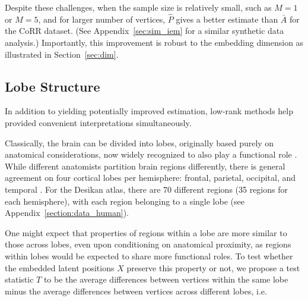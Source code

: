 \documentclass[journal,twoside,web]{ieeecolor}
\begin{document}
Despite these challenges, when the sample size is relatively small, such as $M=1$ or $M=5$, and for larger number of vertices, $\hat{P}$ gives a better estimate than $\bar{A}$ for the CoRR dataset.
(See Appendix~\ref{sec:sim_iem} for a similar synthetic data analysis.)
Importantly, this improvement is robust to the embedding dimension as illustrated in Section~\ref{sec:dim}.



\subsection{Lobe Structure}
\label{section:lobe_structure}
In addition to yielding potentially improved estimation, low-rank methods help provided convenient interpretations simultaneously. 

Classically, the brain can be divided into lobes, originally based purely on anatomical considerations, now widely recognized to also play a functional role \cite{Vanderah2015}.
While different anatomists partition brain regions differently, there is general agreement on four cortical lobes per hemisphere: frontal, parietal, occipital, and temporal \cite{fischl2012freesurfer,desikan2006automated,salat2004thinning}.
For the Desikan atlas, there are 70 different regions (35 regions for each hemisphere), with each region belonging to a single lobe (see Appendix~\ref{section:data_human}). 

One might expect that properties of regions within a lobe are more similar to those across lobes, even upon conditioning on anatomical proximity, as regions within lobes would be expected to share more functional roles.
To test whether the embedded latent positions $X$ preserve this property or not, we propose a test statistic $T$ to be the average differences between vertices within the same lobe minus the average differences between vertices across different lobes, i.e.
\end{document}
